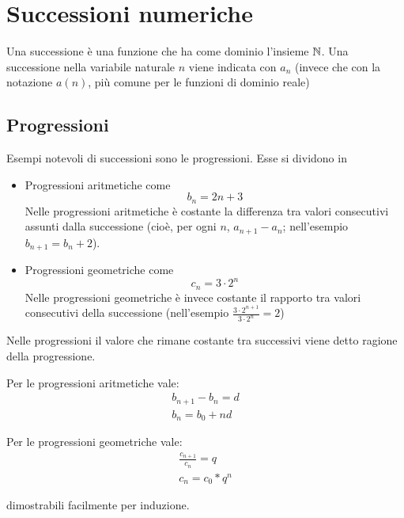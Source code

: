 %
%
%
%


\section{Successioni numeriche}
\begin{defin}
	Una successione è una funzione che ha come dominio l'insieme $\mathbb{N}$. Una successione nella variabile naturale $n$ viene indicata con $a_n$ (invece che con la notazione $a(n)$, più comune per le funzioni di dominio reale)
\end{defin}


\subsection{Progressioni}
\label{succ:progr}
Esempi notevoli di successioni sono le progressioni. Esse si dividono in
\begin{itemize}
	\item Progressioni aritmetiche come
	      \[
		      b_n=2n+3
	      \]
	      Nelle progressioni aritmetiche è costante la differenza tra valori consecutivi assunti dalla successione (cioè, per ogni $n$, $a_{n+1}-a_n$; nell'esempio $b_{n+1}=b_n+2$).
	\item Progressioni geometriche come
	      \[
		      c_n=3\cdot 2^n
	      \]
	      Nelle progressioni geometriche è invece costante il rapporto tra valori consecutivi della successione (nell'esempio $\frac{3\cdot2^{n+1}}{3\cdot2^n}=2$)
\end{itemize}
Nelle progressioni il valore che rimane costante tra successivi viene detto ragione della progressione.

\begin{prop}
	Per le progressioni aritmetiche vale:
	\begin{gather}
		b_{n+1}-b_n=d \\
		b_n=b_0+nd
	\end{gather}
\end{prop}
\begin{prop}
	Per le progressioni geometriche vale:
	\begin{gather}
		\frac{c_{n+1}}{c_n}=q \\
		c_n=c_0*q^n
	\end{gather}

\end{prop}
dimostrabili facilmente per induzione.



